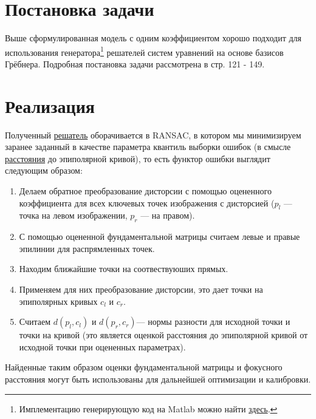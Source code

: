\section{Постановка задачи}

Выше сформулированная модель с одним коэффициентом хорошо подходит для использования генератора\footnote{ Имплементацию генерирующую код на Matlab можно найти \href{https://github.com/PavelTrutman/Automatic-Generator}{здесь}.} решателей систем уравнений на основе базисов Грёбнера. Подробная постановка задачи рассмотрена в \cite{KukelovaPhD} стр. 121 - 149. 


\section{Реализация}

Полученный \href{https://github.com/QuantumMechanicus/camera_calibration/blob/dev/subroutines/distortion_groebner_estimator/Groebner_Estimator.cpp#L125}{решатель} оборачивается в RANSAC, в котором мы минимизируем заранее заданный в качестве параметра квантиль выборки ошибок (в смысле \href{https://github.com/QuantumMechanicus/camera_calibration/blob/dev/core/utils/Functors.h#L11}{расстояния} до эпиполярной кривой), то есть функтор ошибки выглядит следующим образом:
\begin{enumerate}
	\item Делаем обратное преобразование дисторсии с помощью оцененного коэффициента для всех ключевых точек изображения с дисторсией ($p_l$ --- точка на левом изображении, $p_r$ --- на правом).
	\item С помощью оцененной фундаментальной  матрицы считаем левые и правые эпилинии для распрямленных точек.
	\item Находим ближайшие точки на соотвествуюших прямых.
	\item Применяем для них преобразование дисторсии, это дает точки на эпиполярных кривых $c_l$ и $c_r$.
	\item Считаем $d\left(p_l, c_l\right)$ и $d\left(p_r, c_r\right)$--- нормы разности для исходной точки и точки на кривой (это является оценкой расстояния до эпиполярной кривой от исходной точки при оцененных параметрах). 
\end{enumerate}

Найденные таким образом оценки фундаментальной матрицы и фокусного расстояния могут быть использованы для дальнейшей оптимизации и калибровки. 